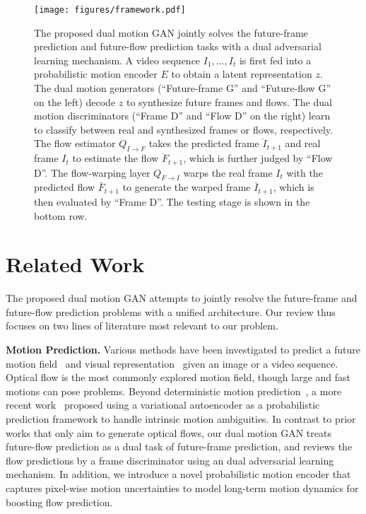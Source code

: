 \documentclass[10pt,twocolumn,letterpaper]{article}
\begin{document}
		\begin{figure*}[!tp]
			\begin{center}
				\texttt{[image: figures/framework.pdf]}
				\caption{The proposed dual motion GAN jointly solves the future-frame prediction and future-flow prediction tasks with a dual adversarial learning mechanism. A video sequence $I_1, \dots, I_t$ is first fed into a probabilistic motion encoder $E$ to obtain a latent representation $z$. The dual motion generators (``Future-frame G'' and ``Future-flow G'' on the left) decode $z$ to synthesize future frames and flows. The dual motion discriminators (``Frame D'' and ``Flow D'' on the right) learn to classify between real and synthesized frames or flows, respectively. The flow estimator $Q_{I\rightarrow F}$ takes the predicted frame $\ddot{I}_{t+1}$ and real frame $I_t$ to estimate the flow $\ddot{F}_{t+1}$, which is further judged by ``Flow D''. The flow-warping layer $Q_{F \rightarrow I}$ warps the real frame $I_t$ with the predicted flow $\bar{F}_{t+1}$ to generate the warped frame $\bar{I}_{t+1}$, which is then evaluated by ``Frame D''. The testing stage is shown in the bottom row.} 
				\label{fig:framework}
			\end{center}
			\vspace{-9mm}
		\end{figure*}
	\section{Related Work}
	
	The proposed dual motion GAN attempts to jointly resolve the future-frame and future-flow prediction problems with a unified architecture. Our review thus focuses on two lines of literature most relevant to our problem.
	
	\textbf{Motion Prediction.} Various methods have been investigated to predict a future motion field~\cite{liu2011sift,walker2014patch,walker2016uncertain, long2016learning, LuoPHAF17} and visual representation~\cite{srivastava2015unsupervised,vondrick2016anticipating} given an image or a video sequence. Optical flow is the most commonly explored motion field, though large and fast motions can pose problems. Beyond deterministic motion prediction~\cite{liu2011sift, long2016learning}, a more recent work~\cite{walker2016uncertain} proposed using a variational autoencoder as a probabilistic prediction framework to handle intrinsic motion ambiguities. In contrast to prior works that only aim to generate optical flows, our dual motion GAN treats future-flow prediction as a dual task of future-frame prediction, and reviews the flow predictions by a frame discriminator using an dual adversarial learning mechanism. In addition, we introduce a novel probabilistic motion encoder that captures pixel-wise motion uncertainties to model long-term motion dynamics for boosting flow prediction.
	
\end{document}
